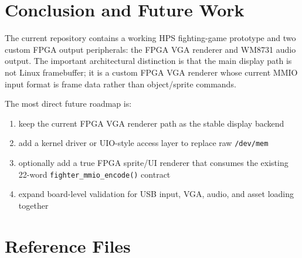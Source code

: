 \documentclass[12pt,a4paper]{article}
\begin{document}
\section{Conclusion and Future Work}

The current repository contains a working HPS fighting-game prototype and two
custom FPGA output peripherals: the FPGA VGA renderer and WM8731 audio output.
The important architectural distinction is that the main display path is not
Linux framebuffer; it is a custom FPGA VGA renderer whose current MMIO input
format is frame data rather than object/sprite commands.

The most direct future roadmap is:

\begin{enumerate}
  \item keep the current FPGA VGA renderer path as the stable display backend
  \item add a kernel driver or UIO-style access layer to replace raw
  \texttt{/dev/mem}
  \item optionally add a true FPGA sprite/UI renderer that consumes the
  existing 22-word \texttt{fighter\_mmio\_encode()} contract
  \item expand board-level validation for USB input, VGA, audio, and asset
  loading together
\end{enumerate}

\section{Reference Files}
\end{document}
